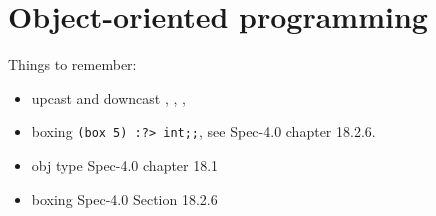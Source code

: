 \chapter{Object-oriented programming}
\label{chap:oop}
Things to remember: 
\begin{itemize}
\item upcast and downcast , \token{:>},
  , 
\item boxing \lstinline|(box 5) :?> int;;|, see Spec-4.0 chapter
  18.2.6.
\item obj type Spec-4.0 chapter 18.1
\item boxing Spec-4.0 Section 18.2.6
\end{itemize}
